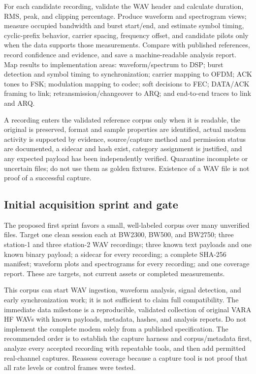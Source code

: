 \documentclass[11pt,a4paper]{article}
\begin{document}
For each candidate recording, validate the WAV header and calculate duration,
RMS, peak, and clipping percentage. Produce waveform and spectrogram views;
measure occupied bandwidth and burst start/end, and estimate symbol timing,
cyclic-prefix behavior, carrier spacing, frequency offset, and candidate
pilots only when the data supports those measurements. Compare with published
references, record confidence and evidence, and save a machine-readable
analysis report. Map results to implementation areas: waveform/spectrum to
DSP; burst detection and symbol timing to synchronization; carrier mapping to
OFDM; ACK tones to FSK; modulation mapping to codec; soft decisions to FEC;
DATA/ACK framing to link; retransmission/changeover to ARQ; and end-to-end
traces to link and ARQ.

A recording enters the validated reference corpus only when it is readable,
the original is preserved, format and sample properties are identified,
actual modem activity is supported by evidence, source/capture method and
permission status are documented, a sidecar and hash exist, category
assignment is justified, and any expected payload has been independently
verified. Quarantine incomplete or uncertain files; do not use them as golden
fixtures. Existence of a WAV file is not proof of a successful capture.

\subsection{Initial acquisition sprint and gate}
The proposed first sprint favors a small, well-labeled corpus over many
unverified files. Target one clean session each at BW2300, BW500, and BW2750;
three station-1 and three station-2 WAV recordings; three known text payloads
and one known binary payload; a sidecar for every recording; a complete
SHA-256 manifest; waveform plots and spectrograms for every recording; and
one coverage report. These are targets, not current assets or completed
measurements.

This corpus can start WAV ingestion, waveform analysis, signal detection, and
early synchronization work; it is not sufficient to claim full compatibility.
The immediate data milestone is a reproducible, validated collection of
original VARA HF WAVs with known payloads, metadata, hashes, and analysis
reports. Do not implement the complete modem solely from a published
specification. The recommended order is to establish the capture harness and
corpus/metadata first, analyze every accepted recording with repeatable tools,
and then add permitted real-channel captures. Reassess coverage because a
capture tool is not proof that all rate levels or control frames were tested.
\end{document}
